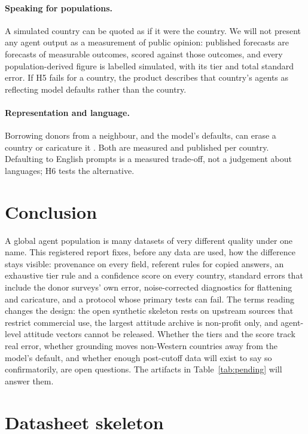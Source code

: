 \documentclass[10pt]{article}
\begin{document}
\paragraph{Speaking for populations.} A simulated country can be quoted as if it were the country. We will not present any agent output as a measurement of public opinion: published forecasts are forecasts of measurable outcomes, scored against those outcomes, and every population-derived figure is labelled simulated, with its tier and total standard error. If H5 fails for a country, the product describes that country's agents as reflecting model defaults rather than the country.

\paragraph{Representation and language.} Borrowing donors from a neighbour, and the model's defaults, can erase a country or caricature it \citep{wang2024flatten}. Both are measured and published per country. Defaulting to English prompts is a measured trade-off, not a judgement about languages; H6 tests the alternative.

\section{Conclusion}

A global agent population is many datasets of very different quality under one name. This registered report fixes, before any data are used, how the difference stays visible: provenance on every field, referent rules for copied answers, an exhaustive tier rule and a confidence score on every country, standard errors that include the donor surveys' own error, noise-corrected diagnostics for flattening and caricature, and a protocol whose primary tests can fail. The terms reading changes the design: the open synthetic skeleton rests on upstream sources that restrict commercial use, the largest attitude archive is non-profit only, and agent-level attitude vectors cannot be released. Whether the tiers and the score track real error, whether grounding moves non-Western countries away from the model's default, and whether enough post-cutoff data will exist to say so confirmatorily, are open questions. The artifacts in Table~\ref{tab:pending} will answer them.

\appendix
\section{Datasheet skeleton}
\label{app:datasheet}
\end{document}
